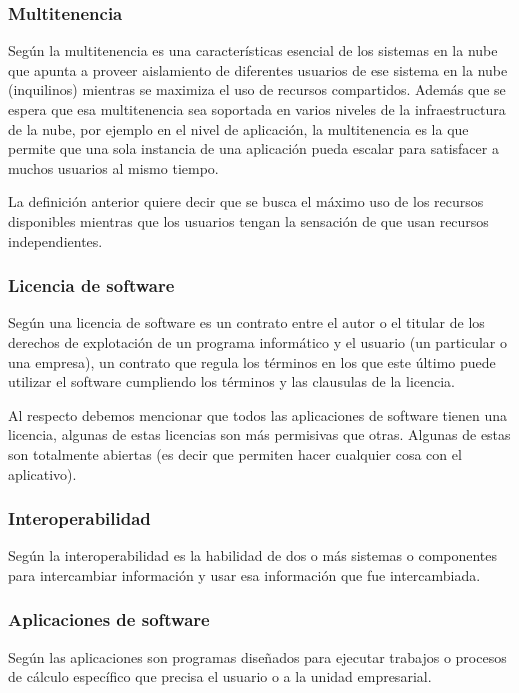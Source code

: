 \subsubsection{Multitenencia}

Según \cite{chandra} la multitenencia es una características esencial de los
sistemas en la nube que apunta a proveer aislamiento de diferentes usuarios de
ese sistema en la nube (inquilinos) mientras se maximiza el uso de recursos compartidos.
Además \citep{chandra} que se espera que esa multitenencia sea soportada en varios niveles de la infraestructura
de la nube, por ejemplo en el nivel de aplicación, la multitenencia es la que permite
que una sola instancia de una aplicación pueda escalar para satisfacer a muchos
usuarios al mismo tiempo.

La definición anterior quiere decir que se busca el máximo uso de los recursos
disponibles mientras que los usuarios tengan la sensación de que usan recursos
independientes.
\subsubsection{Licencia de software}
Según \cite{moro} una licencia de software es un contrato entre el autor o el titular
de los derechos de explotación de un programa informático y el usuario (un particular
o una empresa), un contrato que regula los términos en los que este último puede
utilizar el software cumpliendo los términos y las clausulas de la licencia.

Al respecto debemos mencionar que todos las aplicaciones de software tienen una
licencia, algunas de estas licencias son más permisivas que otras. Algunas de estas
son totalmente abiertas (es decir que permiten hacer cualquier cosa con el aplicativo).
\subsubsection{Interoperabilidad}
Según \cite{kajan} la interoperabilidad es la habilidad de dos o más sistemas o
componentes para intercambiar información y usar esa información que fue intercambiada.
\subsubsection{Aplicaciones de software}

Según \cite{pablos} las aplicaciones son programas diseñados para ejecutar
trabajos o procesos de cálculo específico que precisa el usuario o a la unidad
empresarial.
